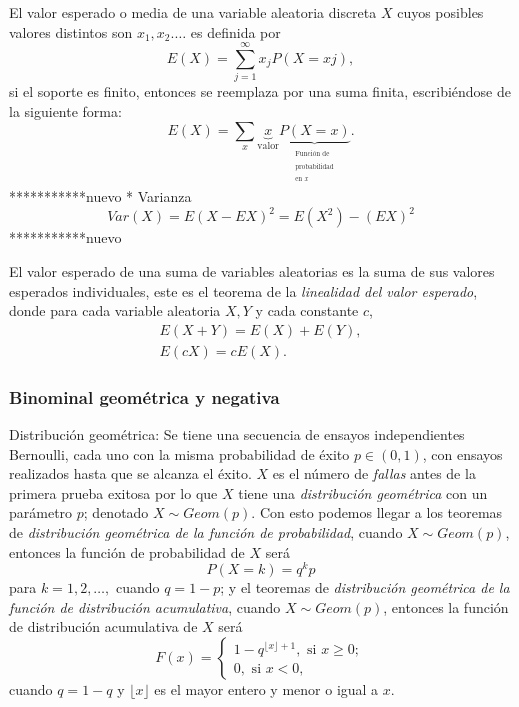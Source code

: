 \documentclass[letterpaper]{article}
\begin{document}
El valor esperado o media de una variable aleatoria discreta $X$ cuyos posibles valores distintos son $x_1,x_2.\ldots$ es definida por
\begin{equation}
E(X)=\sum_{j=1}^{\infty}x_jP(X=xj),
\end{equation}
si el soporte es finito, entonces se reemplaza por una suma finita, escribiéndose de la siguiente forma:
\begin{equation}
E(X)=\sum_{x}\underbrace{x}_\text{valor}\underbrace{P(X=x)}_{\begin{matrix}^\text{Función de}\\^\text{probabilidad}\\^\text{en $x$}\end{matrix}}.
\end{equation}
***********nuevo * Varianza
\begin{equation}
Var(X)=E{(X-EX)}^2=E(X^2)-{(EX)}^2
\end{equation}
***********nuevo


El valor esperado de una suma de variables aleatorias es la suma de sus valores esperados individuales, este es el teorema de la \emph{linealidad del valor esperado}, donde para cada variable aleatoria $X,Y$ y cada constante $c$,
\begin{equation}
\begin{matrix}
E(X+Y)=E(X)+E(Y),\\
E(cX)=cE(X).
\end{matrix}
\end{equation}
\subsubsection {Binominal geométrica y negativa}
Distribución geométrica: Se tiene una secuencia de ensayos independientes Bernoulli, cada uno con la misma probabilidad de éxito $p\in(0,1)$, con ensayos realizados hasta que se alcanza el éxito. $X$ es el número de \emph{fallas} antes de la primera prueba exitosa por lo que $X$ tiene una \emph{distribución geométrica} con un parámetro $p$; denotado $X\sim Geom(p)$. Con esto podemos llegar a los teoremas de \emph{distribución geométrica de la función de probabilidad}, cuando $X\sim Geom(p)$, entonces la función de probabilidad de $X$ será
\begin{equation}
P(X=k)=q^kp
\end{equation}
para $k=1,2,\ldots,$ cuando $q=1-p$; y el teoremas de \emph{distribución geométrica de la función de distribución acumulativa}, cuando $X\sim Geom(p)$, entonces la función de distribución acumulativa de $X$ será
    \begin{equation}
    F(x)=
    \begin{cases}
    1-q^{\lfloor x\rfloor+1}, \text{ si } x\geq 0;\\
    0, \text{ si }x < 0,
    \end{cases}
    \end{equation}
cuando $q=1-q$ y $\lfloor x\rfloor$ es el mayor entero y menor o igual a $x$.
\end{document}
